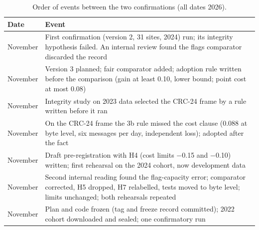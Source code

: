 \begin{table}[!htbp]
\centering
\caption{Order of events between the two confirmations (all dates 2026).}
\label{tab:timeline}
\footnotesize
\begin{tabular}{@{}>{\raggedright\arraybackslash}p{2.3cm}>{\raggedright\arraybackslash}p{11.0cm}@{}}
\toprule
Date & Event \\
\midrule
9 November & First confirmation (version 2, 31 sites, 2024) run; its integrity hypothesis failed. An internal review found the flags comparator discarded the record \\
10 November & Version 3 planned; fair comparator added; adoption rule written before the comparison (gain at least 0.10, lower bound; point cost at most 0.08) \\
10 November & Integrity study on 2023 data selected the CRC-24 frame by a rule written before it ran \\
10 November & On the CRC-24 frame the 3b rule missed the cost clause (0.088 at byte level, six messages per day, independent loss); adopted after the fact \\
10 November & Draft pre-registration with H4 (cost limits $-$0.15 and $-$0.10) written; first rehearsal on the 2024 cohort, now development data \\
10 November & Second internal reading found the flag-capacity error; comparator corrected, H5 dropped, H7 relabelled, tests moved to byte level; limits unchanged; both rehearsals repeated \\
11 November & Plan and code frozen (tag and freeze record committed); 2022 cohort downloaded and sealed; one confirmatory run \\
\bottomrule
\end{tabular}
\end{table}

